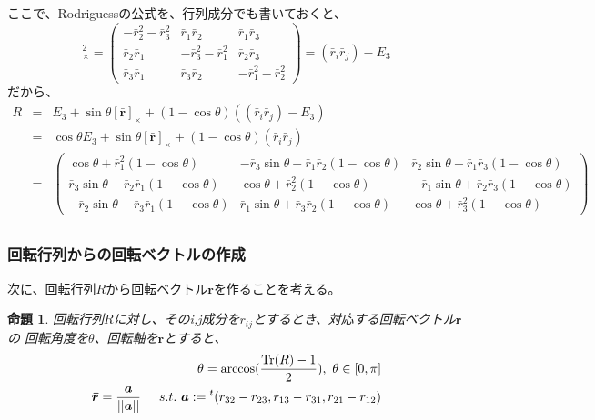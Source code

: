 \documentclass[10pt]{jarticle}
\newtheorem{Prp}{命題}[section]
\newcommand{\brx}{[\bar{\boldsymbol{r}}]_{\times}}
\begin{document}
ここで、Rodriguessの公式を、行列成分でも書いておくと、
\begin{equation}
	\brx^2 = \left(
			\begin{array}{ccc}
				-\bar{r}_2^2-\bar{r}_3^2 & \bar{r}_1\bar{r}_2 & \bar{r}_1\bar{r}_3 \\ 
				\bar{r}_2\bar{r}_1 & -\bar{r}_3^2-\bar{r}_1^2 & \bar{r}_2\bar{r}_3 \\ 
				\bar{r}_3\bar{r}_1 & \bar{r}_3\bar{r}_2 & -\bar{r}_1^2-\bar{r}_2^2 
			\end{array}	
		\right)
		= (\bar{r}_i \bar{r}_j) - E_3 
\end{equation}
だから、
\begin{eqnarray}
	R &=& E_3 + \sin\theta \brx + (1-\cos \theta)((\bar{r}_i \bar{r}_j) - E_3) \nonumber\\
	&=& \cos\theta E_3 + \sin\theta \brx + (1-\cos\theta)(\bar{r}_i \bar{r}_j) \nonumber\\
	&=&	 \left(
	\begin{array}{ccc}
	\cos\theta + \bar{r}_1^2(1-\cos\theta) & -\bar{r}_3\sin\theta + \bar{r}_1\bar{r}_2(1-\cos\theta) & \bar{r}_2\sin\theta + \bar{r}_1\bar{r}_3(1-\cos\theta)\\
	\bar{r}_3\sin\theta + \bar{r}_2\bar{r}_1(1-\cos\theta) & \cos\theta + \bar{r}_2^2(1-\cos\theta) & -\bar{r}_1\sin\theta + \bar{r}_2\bar{r}_3(1-\cos\theta)\\
	-\bar{r}_2\sin\theta + \bar{r}_3\bar{r}_1(1-\cos\theta) & \bar{r}_1\sin\theta + \bar{r}_3\bar{r}_2(1-\cos\theta) & \cos\theta + \bar{r}_3^2(1-\cos\theta)
	\end{array}
	\right) \nonumber\\
\end{eqnarray}

\subsubsection{回転行列からの回転ベクトルの作成}
次に、回転行列$R$から回転ベクトル$\boldsymbol{r}$を作ることを考える。
\begin{Prp}
    回転行列$R$に対し、そのi,j成分を$r_{ij}$とするとき、対応する回転ベクトル$\boldsymbol{r}$の
    回転角度を$\theta$、回転軸を$\boldsymbol{\bar{r}}$とすると、
    \begin{eqnarray}
        \theta = \arccos(\frac{\mathrm{Tr}(R)-1}{2}),\ \theta \in [0,\pi] \\
        \boldsymbol{\bar{r}} = \frac{\boldsymbol{a}}{||\boldsymbol{a}||}
        \hspace{5mm}s.t.\  \boldsymbol{a} := {}^t(r_{32}-r_{23},r_{13}-r_{31},r_{21}-r_{12}) 
    \end{eqnarray}
\end{Prp}
\end{document}
